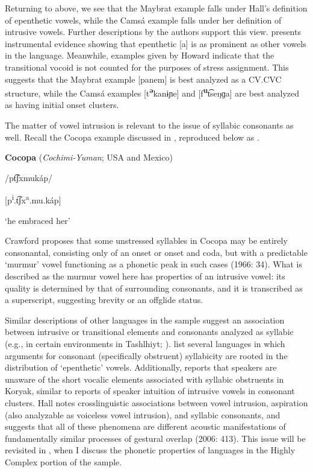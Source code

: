   Returning to  above, we see that the Maybrat example falls under Hall’s definition of epenthetic vowels, while the Camsá example falls under her definition of intrusive vowels. Further descriptions by the authors support this view. \citet[36]{Dol2007} presents instrumental evidence showing that epenthetic [a] is as prominent as other vowels in the language. Meanwhile, examples given by Howard indicate that the transitional vocoid is not counted for the purposes of stress assignment. This suggests that the Maybrat example [panem] is best analyzed as a CV.CVC structure, while the Camsá examples [t\textbf{\textsuperscript{ə}}kanɨɲe] and [f\textbf{\textsuperscript{u}}t͡seŋɡa] are best analyzed as having initial onset clusters.

  The matter of vowel intrusion is relevant to the issue of syllabic consonants as well. Recall the Cocopa example discussed in , reproduced below as .

\ea\label{ex:3.10}
  \textbf{Cocopa} (\textit{Cochimi-Yuman}; USA and Mexico)

  /pt͡ʃxmukáp/ 
  
  [p\textsuperscript{i}.t͡ʃx\textsuperscript{a}.mu.káp]

\glt ‘he embraced her’
\citep[43]{Crawford1966}
\z

Crawford proposes that some unstressed syllables in Cocopa may be entirely consonantal, consisting only of an onset or onset and coda, but with a predictable ‘murmur’ vowel functioning as a phonetic peak in such cases (1966: 34). What is described as the murmur vowel here has properties of an intrusive vowel: its quality is determined by that of surrounding consonants, and it is transcribed as a superscript, suggesting brevity or an offglide status.

  Similar descriptions of other languages in the sample suggest an association between intrusive or transitional elements and consonants analyzed as syllabic (e.g., in certain environments in Tashlhiyt; \citealt{DellElmedlaoui2002}). \citet{HargusBeavert2006} list several languages in which arguments for consonant (specifically obstruent) syllabicity are rooted in the distribution of ‘epenthetic’ vowels. Additionally, \citet[185-6]{Bell1978a} reports that speakers are unaware of the short vocalic elements associated with syllabic obstruents in Koryak, similar to reports of speaker intuition of intrusive vowels in consonant clusters. Hall notes crosslinguistic associations between vowel intrusion, aspiration (also analyzable as voiceless vowel intrusion), and syllabic consonants, and suggests that all of these phenomena are different acoustic manifestations of fundamentally similar processes of gestural overlap (2006: 413). This issue will be revisited in , when I discuss the phonetic properties of languages in the Highly Complex portion of the sample.

